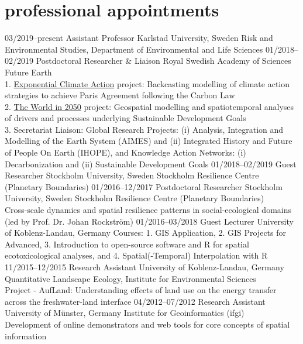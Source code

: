 \documentclass[]{friggeri-cv} %
\begin{document}
\section{professional appointments}

\begin{entrylist}
\entry
{\small{03/2019--present}}
{Assistant Professor}
{Karlstad University, Sweden}
{Risk and Environmental Studies, Department of Environmental and Life Sciences}
\entry
{\small{01/2018--02/2019}}
{Postdoctoral Researcher \& Liaison}
{Royal Swedish Academy of Sciences}
{Future Earth \\
1. \href{https://x-cac.futureearth.org/} {Exponential Climate Action} project: Backcasting modelling of climate action strategies to achieve Paris Agreement following the Carbon Law\\
2. \href{http://www.iiasa.ac.at/web/home/research/twi/TWI2050.html} {The World in 2050} project: Geospatial modelling and spatiotemporal analyses of drivers and processes underlying Sustainable Development Goals\\
3. Secretariat Liaison: Global Research Projects: (i) Analysis, Integration and Modelling of the Earth System (AIMES) and (ii) Integrated History and Future of People On Earth (IHOPE), and Knowledge Action Networks: (i) Decarbonization and (ii) Sustainable Development Goals}
\entry
{\small{01/2018--02/2019}}
{Guest Researcher}
{Stockholm University, Sweden}
{Stockholm Resilience Centre (Planetary Boundaries)}
\entry
{\small{01/2016--12/2017}}
{Postdoctoral Researcher}
{Stockholm University, Sweden}
{Stockholm Resilience Centre (Planetary Boundaries) \\
Cross-scale dynamics and spatial resilience patterns in social-ecological domains (led by Prof. Dr. Johan Rockstr\"om)}
\entry
{\small{01/2016--03/2018}}
{Guest Lecturer}
{University of Koblenz-Landau, Germany}
{Courses: 1. GIS Application, 2. GIS Projects for Advanced, 3. Introduction to open-source software and R for spatial ecotoxicological analyses, and 4. Spatial(-Temporal) Interpolation with R}
\entry
{\small{11/2015--12/2015}}
{Research Assistant}
{University of Koblenz-Landau, Germany}
{Quantitative Landscape Ecology, Institute for Environmental Sciences\\
Project - AufLand: Understanding effects of land use on the energy transfer across the freshwater-land interface}
\entry
{\small{04/2012--07/2012}}
{Research Assistant}
{University of M\"unster, Germany}
{Institute for Geoinformatics (ifgi)\\
Development of online demonstrators and web tools for core concepts of spatial information}
\end{entrylist}
\end{document}

